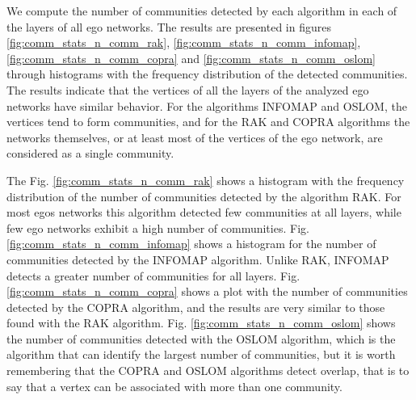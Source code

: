 








We compute the number of communities detected by each algorithm in each of the layers of all ego networks. The results are presented in figures \ref{fig:comm_stats_n_comm_rak}, \ref{fig:comm_stats_n_comm_infomap}, \ref{fig:comm_stats_n_comm_copra} and \ref{fig:comm_stats_n_comm_oslom} through histograms with the frequency distribution of the detected communities. The results indicate that the vertices of all the layers of the analyzed ego networks have similar behavior. For the algorithms INFOMAP and OSLOM, the vertices tend to form communities, and for the RAK and COPRA algorithms the networks themselves, or at least most of the vertices of the ego network, are considered as a single community.

The Fig. \ref{fig:comm_stats_n_comm_rak} shows a histogram with the frequency distribution of the number of communities detected by the algorithm RAK. For most egos networks this algorithm detected few communities at all layers, while few ego networks exhibit a high number of communities. Fig. \ref{fig:comm_stats_n_comm_infomap} shows a histogram for the number of communities detected by the INFOMAP algorithm. Unlike RAK, INFOMAP detects a greater number of communities for all layers. Fig. \ref{fig:comm_stats_n_comm_copra} shows a plot with the number of communities detected by the COPRA algorithm, and the results are very similar to those found with the RAK algorithm. Fig. \ref{fig:comm_stats_n_comm_oslom} shows the number of communities detected with the OSLOM algorithm, which is the algorithm that can identify the largest number of communities, but it is worth remembering that the COPRA and OSLOM algorithms detect overlap, that is to say that a vertex can be associated with more than one community.


